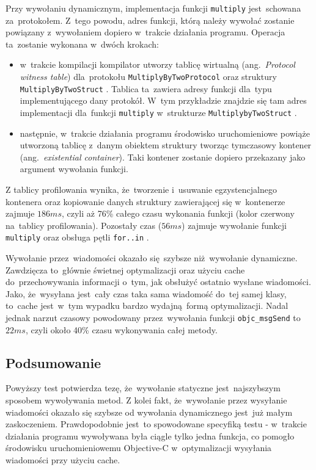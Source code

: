 \documentclass[mgr, shortabstract]{iithesis}
\newcommand{\ang}[1]{ang.~\textit{#1}}
\newcommand{\swiftinline}[1]{
    \texttt{#1}
}
\newcommand{\objcinline}[1]{
    \texttt{#1}
}
\begin{document}
Przy wywołaniu dynamicznym, implementacja funkcji \swiftinline{multiply} jest~schowana za~protokołem. Z~tego powodu, adres funkcji, którą należy wywołać zostanie powiązany z~wywołaniem dopiero w~trakcie działania programu. Operacja ta~zostanie wykonana w~dwóch krokach:

\begin{itemize}
    \item w~trakcie kompilacji kompilator utworzy tablicę wirtualną (\ang{Protocol witness table}) dla~protokołu \swiftinline{MultiplyByTwoProtocol} oraz struktury \swiftinline{MultiplyByTwoStruct}. Tablica ta~zawiera adresy funkcji dla~typu implementującego dany protokół. W~tym przykładzie znajdzie się tam adres implementacji dla~funkcji \swiftinline{multiply} w~strukturze \swiftinline{MultiplybyTwoStruct}.
    \item następnie, w~trakcie działania programu środowisko uruchomieniowe powiąże utworzoną tablicę z~danym obiektem struktury tworząc tymczasowy kontener (\ang{existential container}). Taki kontener zostanie dopiero przekazany jako argument wywołania funkcji.
\end{itemize}

Z tablicy profilowania wynika, że~tworzenie i~usuwanie  egzystencjalnego kontenera oraz kopiowanie danych struktury zawierającej się w~kontenerze zajmuje $186ms$, czyli aż 76\% całego czasu wykonania funkcji (kolor czerwony na~tablicy profilowania). Pozostały czas ($56ms$) zajmuje wywołanie funkcji \swiftinline{multiply} oraz obsługa pętli \swiftinline{for..in}.

Wywołanie przez~wiadomości okazało się szybsze niż wywołanie dynamiczne. Zawdzięcza to~głównie świetnej optymalizacji oraz użyciu cache do~przechowywania informacji o~tym, jak obsłużyć ostatnio wysłane wiadomości. Jako, że~wysyłana jest~cały czas taka sama wiadomość do~tej samej klasy, to~cache jest~w~tym wypadku bardzo wydajną formą optymalizacji. Nadal jednak narzut czasowy powodowany przez~wywołania funkcji \objcinline{objc_msgSend} to~$22ms$, czyli około 40\% czasu wykonywania całej metody.

\subsection{Podsumowanie}

Powyższy test potwierdza tezę, że~wywołanie statyczne jest~najszybszym sposobem wywoływania metod. Z kolei fakt, że~wywołanie przez wysyłanie wiadomości okazało się szybsze od wywołania dynamicznego jest~już małym zaskoczeniem. Prawdopodobnie jest~to spowodowane specyfiką testu - w~trakcie działania programu wywoływana była ciągle tylko jedna funkcja, co pomogło środowisku uruchomieniowemu Objective-C w~optymalizacji wysyłania wiadomości przy użyciu cache.
\end{document}
